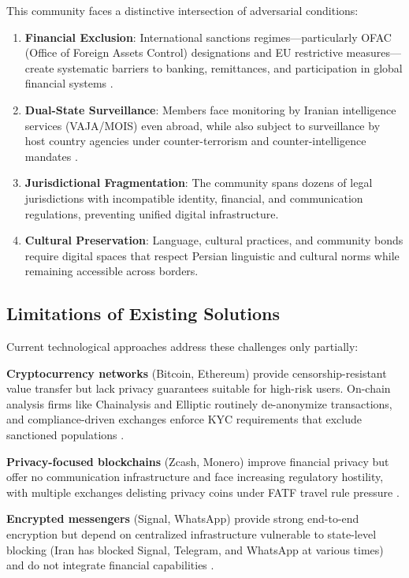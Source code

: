 \documentclass[11pt,a4paper,twocolumn]{article}
\begin{document}
This community faces a distinctive intersection of adversarial conditions:

\begin{enumerate}[leftmargin=*]
  \item \textbf{Financial Exclusion}: International sanctions regimes---particularly OFAC (Office of Foreign Assets Control) designations and EU restrictive measures---create systematic barriers to banking, remittances, and participation in global financial systems \cite{ofac2023iran}.
  \item \textbf{Dual-State Surveillance}: Members face monitoring by Iranian intelligence services (VAJA/MOIS) even abroad, while also subject to surveillance by host country agencies under counter-terrorism and counter-intelligence mandates \cite{hrw2019iran}.
  \item \textbf{Jurisdictional Fragmentation}: The community spans dozens of legal jurisdictions with incompatible identity, financial, and communication regulations, preventing unified digital infrastructure.
  \item \textbf{Cultural Preservation}: Language, cultural practices, and community bonds require digital spaces that respect Persian linguistic and cultural norms while remaining accessible across borders.
\end{enumerate}

\subsection{Limitations of Existing Solutions}

Current technological approaches address these challenges only partially:

\textbf{Cryptocurrency networks} (Bitcoin, Ethereum) provide censorship-resistant value transfer but lack privacy guarantees suitable for high-risk users. On-chain analysis firms like Chainalysis and Elliptic routinely de-anonymize transactions, and compliance-driven exchanges enforce KYC requirements that exclude sanctioned populations \cite{meiklejohn2013fistful}.

\textbf{Privacy-focused blockchains} (Zcash, Monero) improve financial privacy but offer no communication infrastructure and face increasing regulatory hostility, with multiple exchanges delisting privacy coins under FATF travel rule pressure \cite{fatf2021virtual}.

\textbf{Encrypted messengers} (Signal, WhatsApp) provide strong end-to-end encryption but depend on centralized infrastructure vulnerable to state-level blocking (Iran has blocked Signal, Telegram, and WhatsApp at various times) and do not integrate financial capabilities \cite{anderson2019measuring}.
\end{document}
